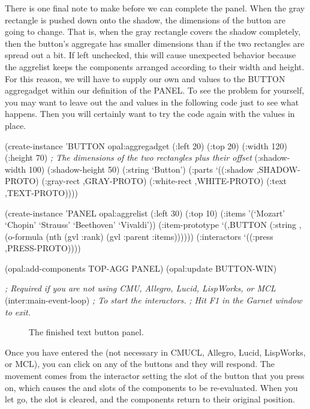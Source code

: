 There is one final note to make before we can complete the panel.
When the gray rectangle is pushed down onto the shadow, the dimensions
of the button are going to change.  That is, when the gray
rectangle covers the shadow completely, then the button's aggregate has
smaller dimensions than if the two rectangles are spread out a bit.
If left unchecked, this will cause unexpected behavior because the
aggrelist keeps the components arranged according to their width and
height.  For this reason, we will have to supply our own 
and  values to the BUTTON aggregadget within our
definition of the PANEL.  To see the problem for yourself, you may
want to leave out the  and  values in the
following code just to see what happens.  Then you will certainly want
to try the code again with the values in place.

\begin{programexample}
(create-instance 'BUTTON opal:aggregadget
   (:left 20) (:top 20)
   (:width 120) (:height 70)  {\it ; The dimensions of the two rectangles plus their offset}
   (:shadow-width 100) (:shadow-height 50)
   (:string `Button')
   (:parts
    `((:shadow ,SHADOW-PROTO)
      (:gray-rect ,GRAY-PROTO)
      (:white-rect ,WHITE-PROTO)
      (:text ,TEXT-PROTO))))

(create-instance 'PANEL opal:aggrelist
   (:left 30) (:top 10)
   (:items '(`Mozart' `Chopin' `Strauss' `Beethoven' `Vivaldi'))
   (:item-prototype
    `(,BUTTON
      (:string ,(o-formula (nth (gvl :rank) (gvl :parent :items))))))
   (:interactors
    `((:press ,PRESS-PROTO))))

(opal:add-components TOP-AGG PANEL)
(opal:update BUTTON-WIN)

{\it ; Required if you are not using CMU, Allegro, Lucid, LispWorks, or MCL}
(inter:main-event-loop)  {\it ; To start the interactors.}
                         {\it ; Hit F1 in the Garnet window to exit.}
\end{programexample}

\begin{figure}
\begin{center}
\end{center}
\caption{The finished text button panel.}
\end{figure}

Once you have entered the  (not necessary in CMUCL,
Allegro, Lucid, LispWorks, or MCL), you can click on any of the buttons and
they will respond.  The movement comes from the interactor setting the
 slot of the button that you press on, which
causes the  and  slots of the components to be
re-evaluated.  When you let go, the  slot is
cleared, and the components return to their original position.

